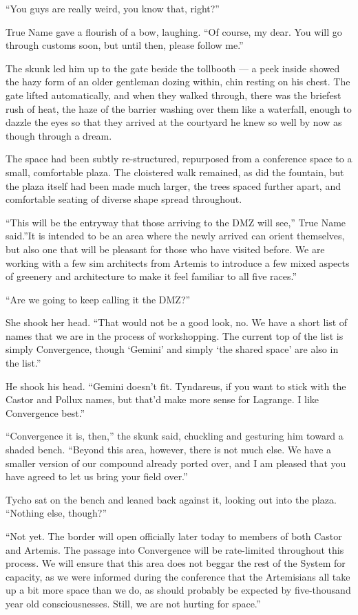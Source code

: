 ``You guys are really weird, you know that, right?''

True Name gave a flourish of a bow, laughing. ``Of course, my dear. You will go through customs soon, but until then, please follow me.''

The skunk led him up to the gate beside the tollbooth — a peek inside showed the hazy form of an older gentleman dozing within, chin resting on his chest. The gate lifted automatically, and when they walked through, there was the briefest rush of heat, the haze of the barrier washing over them like a waterfall, enough to dazzle the eyes so that they arrived at the courtyard he knew so well by now as though through a dream.

The space had been subtly re-structured, repurposed from a conference space to a small, comfortable plaza. The cloistered walk remained, as did the fountain, but the plaza itself had been made much larger, the trees spaced further apart, and comfortable seating of diverse shape spread throughout.

``This will be the entryway that those arriving to the DMZ will see,'' True Name said.''It is intended to be an area where the newly arrived can orient themselves, but also one that will be pleasant for those who have visited before. We are working with a few sim architects from Artemis to introduce a few mixed aspects of greenery and architecture to make it feel familiar to all five races.''

``Are we going to keep calling it the DMZ?''

She shook her head. ``That would not be a good look, no. We have a short list of names that we are in the process of workshopping. The current top of the list is simply Convergence, though `Gemini' and simply `the shared space' are also in the list.''

He shook his head. ``Gemini doesn't fit. Tyndareus, if you want to stick with the Castor and Pollux names, but that'd make more sense for Lagrange. I like Convergence best.''

``Convergence it is, then,'' the skunk said, chuckling and gesturing him toward a shaded bench. ``Beyond this area, however, there is not much else. We have a smaller version of our compound already ported over, and I am pleased that you have agreed to let us bring your field over.''

Tycho sat on the bench and leaned back against it, looking out into the plaza. ``Nothing else, though?''

``Not yet. The border will open officially later today to members of both Castor and Artemis. The passage into Convergence will be rate-limited throughout this process. We will ensure that this area does not beggar the rest of the System for capacity, as we were informed during the conference that the Artemisians all take up a bit more space than we do, as should probably be expected by five-thousand year old consciousnesses. Still, we are not hurting for space.''

